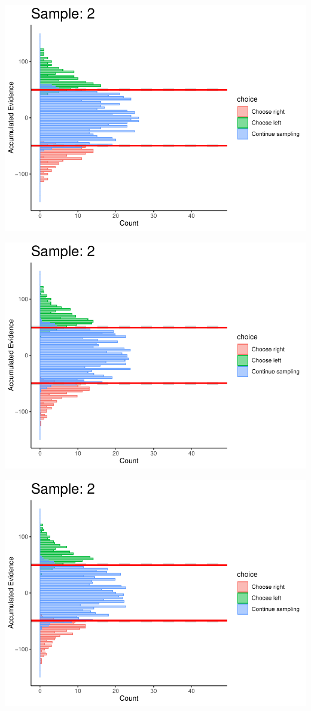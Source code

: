 \documentclass[
]{book}
\begin{document}
\begin{center}\includegraphics[width=0.8\linewidth]{LateNightBayes_files/figure-latex/fixed_dcb-16} \end{center}

\begin{center}\includegraphics[width=0.8\linewidth]{LateNightBayes_files/figure-latex/fixed_dcb-17} \end{center}

\begin{center}\includegraphics[width=0.8\linewidth]{LateNightBayes_files/figure-latex/fixed_dcb-18} \end{center}
\end{document}
